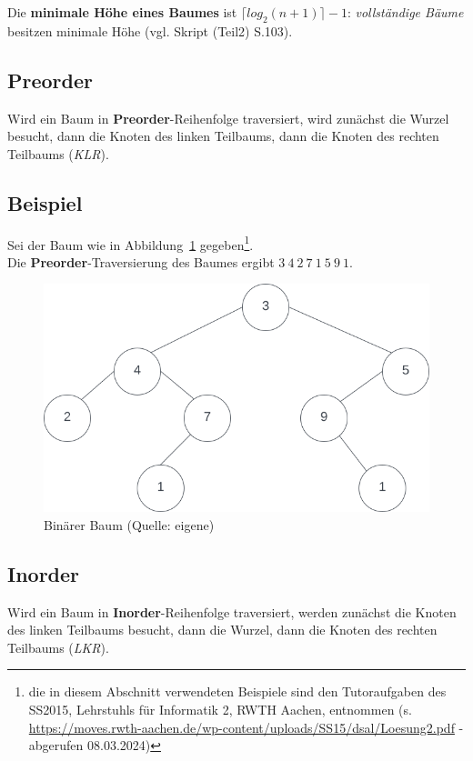 \noindent
Die \textbf{minimale Höhe eines Baumes} ist $\lceil log_2(n + 1) \rceil - 1$: \textit{vollständige Bäume} besitzen minimale Höhe (vgl. Skript (Teil2) S.103).\\


\subsection{Preorder}
Wird ein Baum in \textbf{Preorder}-Reihenfolge traversiert, wird zunächst die Wurzel besucht, dann die Knoten des linken Teilbaums, dann die Knoten des rechten Teilbaums (\textit{KLR}).


\subsection*{Beispiel}
Sei der Baum wie in Abbildung~\ref{fig:bintree} gegeben\footnote{
die in diesem Abschnitt verwendeten Beispiele sind den Tutoraufgaben des SS2015, Lehrstuhls für Informatik 2, RWTH Aachen, entnommen (s. \url{https://moves.rwth-aachen.de/wp-content/uploads/SS15/dsal/Loesung2.pdf} - abgerufen 08.03.2024)
}.\\

\noindent
Die \textbf{Preorder}-Traversierung des Baumes ergibt  $3\ 4\ 2\ 7\ 1\ 5\ 9\ 1$.

\begin{figure}
    \begin{center}
        \includegraphics[scale=0.4]{chapters/Datenstrukturen und Algorithmen/img/bintree}
        \caption{Binärer Baum (Quelle: eigene)}
        \label{fig:bintree}
    \end{center}
\end{figure}

\subsection{Inorder}
Wird ein Baum in \textbf{Inorder}-Reihenfolge traversiert, werden zunächst die Knoten des linken Teilbaums besucht, dann die Wurzel, dann die Knoten des rechten Teilbaums (\textit{LKR}).


